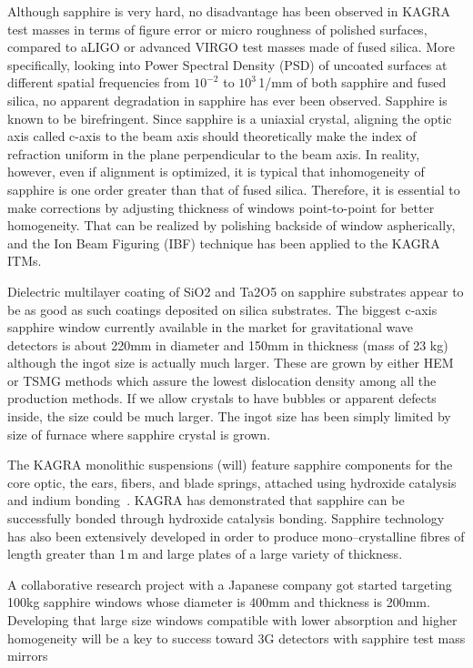 Although sapphire is very hard, no disadvantage has been observed in KAGRA test masses in terms of figure error or micro roughness of polished surfaces\cite{Hirose_2014a}, compared to aLIGO or advanced VIRGO test masses made of fused silica.  More specifically, looking into Power Spectral Density (PSD) of uncoated surfaces at different spatial frequencies from $10^{-2}$ to $10^3$\,1/mm of both sapphire and fused silica,  no apparent degradation in sapphire has ever been observed.
Sapphire is known to be birefringent. Since sapphire is a uniaxial crystal, aligning the optic axis called c-axis to the beam axis should theoretically make the index of refraction uniform in the plane perpendicular to the beam axis. In reality, however, even if alignment is optimized, it is typical that inhomogeneity of sapphire is one order greater than that of fused silica. Therefore, it is essential to make corrections by adjusting thickness of windows point-to-point for better homogeneity. That can be realized by polishing backside of window aspherically, and the Ion Beam Figuring (IBF) technique has been applied to the KAGRA ITMs.

Dielectric multilayer coating of SiO2 and Ta2O5 on sapphire substrates appear to be as good as such coatings deposited on silica substrates\cite{Hirose_2014b}. 
The biggest c-axis sapphire window currently available in the market for gravitational wave detectors is about 220mm in diameter and 150mm in thickness (mass of 23 kg) although the ingot size is actually much larger. These are grown by either HEM or TSMG methods which assure the lowest dislocation density among all the production methods. If we allow crystals to have bubbles or apparent defects inside, the size could be much larger. The ingot size has been simply limited by size of furnace where sapphire crystal is grown.

The KAGRA monolithic suspensions (will) feature sapphire components for the core optic, the ears, fibers, and blade springs, attached using hydroxide catalysis and indium bonding~\cite{Kumar:2016_KAGRA}. KAGRA has demonstrated that sapphire can be successfully bonded through hydroxide catalysis bonding. Sapphire technology has also been extensively developed in order to produce mono--crystalline fibres of length greater than 1\,m and large plates of a large variety of thickness. 

A collaborative research project with a Japanese company got started targeting 100kg sapphire windows whose diameter is 400mm and thickness is 200mm. Developing that large size windows compatible with lower absorption and higher homogeneity will be a key to success toward 3G detectors with sapphire test mass mirrors



